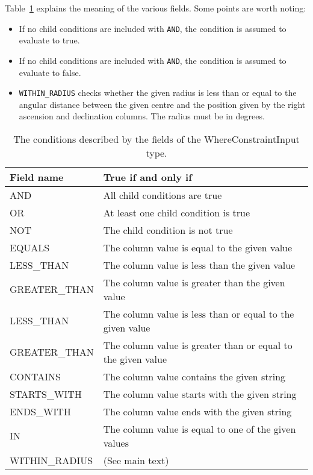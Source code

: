 Table~\ref{tab:whereConstraintInputFields} explains the meaning of the various fields. Some points are worth noting:

\begin{itemize}
    \item If no child conditions are included with \verb|AND|, the condition is assumed to evaluate to true.
    \item If no child conditions are included with \verb|AND|, the condition is assumed to evaluate to false.
    \item \verb|WITHIN_RADIUS| checks whether the given radius is less than or equal to the angular distance between the given centre and the position given by the right ascension and declination columns. The radius must be in degrees.
\end{itemize}

\begin{table}[]
    \centering
    \begin{tabular}{ll}
         Field name &  True if and only if\\\hline
         AND & All child conditions are true\\
         OR & At least one child condition is true\\
         NOT & The child condition is not true\\
         EQUALS & The column value is equal to the given value\\
         LESS\_THAN & The column value is less than the given value\\
         GREATER\_THAN & The column value is greater than the given value\\
         LESS\_THAN & The column value is less than or equal to the given value\\
         GREATER\_THAN & The column value is greater than or equal to the given value\\
         CONTAINS & The column value contains the given string\\
         STARTS\_WITH & The column value starts with the given string\\
         ENDS\_WITH & The column value ends with the given string\\
         IN &The column value is equal to one of the given values\\
         WITHIN\_RADIUS & (See main text)
    \end{tabular}
    \caption{The conditions described by the fields of the WhereConstraintInput type.}
    \label{tab:whereConstraintInputFields}
\end{table}

